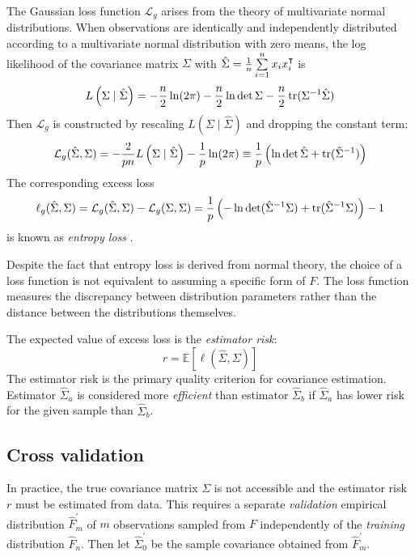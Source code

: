 The Gaussian loss function $\mathcal L_g$  arises from the theory of multivariate normal distributions. When observations are identically and independently distributed according to a multivariate normal distribution with zero means, the log likelihood of the covariance matrix $\Sigma$ with $\hat\Sigma = \frac 1 n \sum\limits_{i=1}^n x_i x_i^\intercal$ is  
\begin{equation}
L\left(\Sigma \mid \hat\Sigma\right) = -\frac n 2 \ln(2\pi) - \frac n 2 \ln \det \Sigma - \frac n 2 \operatorname{tr}(\Sigma^{-1} \hat \Sigma)
\end{equation}
Then $\mathcal L_g$ is constructed by rescaling $L\left(\Sigma \mid \hat\Sigma\right)$ and dropping the constant term:
\begin{equation}
\mathcal L_g(\hat\Sigma,\Sigma) 
=  -\frac 2 {pn} L\left(\Sigma \mid \hat\Sigma \right) - \frac 1 p \ln(2\pi) 
\equiv  \frac 1 p\left(\ln \det \hat \Sigma + \operatorname{tr}(\hat \Sigma^{-1}) \right) 
\end{equation}
The corresponding excess loss 
\begin{equation}
\ell_g(\hat\Sigma,\Sigma) = \mathcal L_g(\hat\Sigma,\Sigma) - \mathcal L_g(\Sigma,\Sigma)  
= \frac 1 p \left(-\ln \det (\hat \Sigma^{-1} \Sigma) + \operatorname{tr}(\hat \Sigma^{-1}\Sigma)\right) - 1
\end{equation}
is known as \emph{entropy loss} \citep{James:1961}.

Despite the fact that entropy loss is derived from normal theory, the choice of a loss function is not equivalent to assuming a specific form of $F$. The loss function measures the discrepancy between distribution parameters rather than the distance between the distributions themselves.  

The expected value of excess loss is the \emph{estimator risk}:
\begin{equation}\label{eq:risk}
r = \mathbb E\left[\ell(\hat\Sigma,\Sigma)\right]
\end{equation}
The estimator risk is the primary quality criterion for covariance estimation. Estimator $\hat\Sigma_a$ is considered more \emph{efficient} than estimator $\hat\Sigma_b$ if $\hat\Sigma_a$ has lower risk for the given sample than $\hat\Sigma_b$.   

\subsection{Cross validation}
In practice, the true covariance matrix $\Sigma$ is not accessible and the estimator risk $r$ must be estimated from data. This requires a separate \emph{validation} empirical distribution $\hat F_m^\prime$ of $m$ observations sampled from $F$ independently of the \emph{training} distribution $\hat F_n$. 
Then let  $\hat \Sigma_0^\prime$ be the sample covariance obtained from $\hat F_m^\prime$. 

